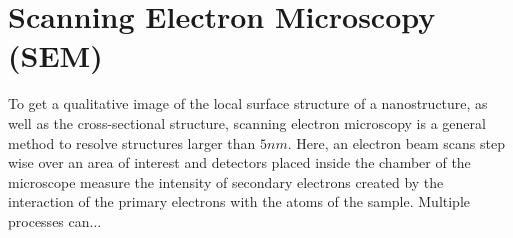 \documentclass[\main/dresen_thesis.tex]{subfiles}
\begin{document}
  \section{Scanning Electron Microscopy (SEM)}
    \label{ch:methods:sem}
    To get a qualitative image of the local surface structure of a nanostructure, as well as the cross-sectional structure, scanning electron microscopy is a general method to resolve structures larger than $5 \unit{nm}$.
    Here, an electron beam scans step wise over an area of interest and detectors placed inside the chamber of the microscope measure the intensity of secondary electrons created by the interaction of the primary electrons with the atoms of the sample.
    Multiple processes can...
\end{document}
